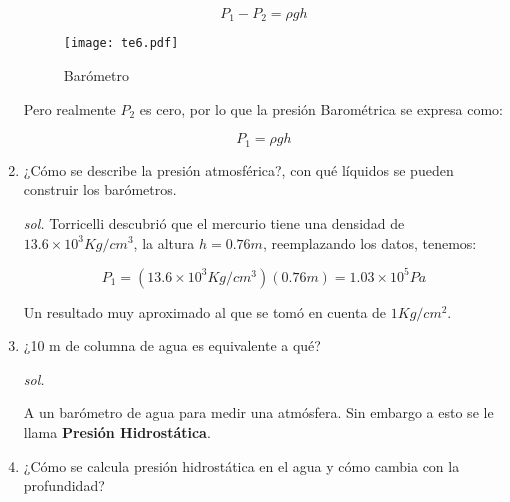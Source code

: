\begin{enumerate}
    \begin{equation*}
        P_1-P_2=\rho gh
    \end{equation*}
    
    \begin{figure}[h!]
      \centering
      \texttt{[image: te6.pdf]}
      \caption{Barómetro}
      \label{te6}
    \end{figure}
    
    Pero realmente $P_2$ es cero, por lo que la presión Barométrica se expresa como:
    
    \begin{equation}
        P_1=\rho gh
    \end{equation}
    
    \item  ¿Cómo se describe la presión atmosférica?, con qué líquidos se pueden construir los barómetros.
    
    \textit{sol. }
    Torricelli descubrió que el mercurio tiene una densidad de $13.6\times 10^3Kg/cm^3$, la altura $h=0.76m$, reemplazando los datos, tenemos:
    
    \begin{equation*}
        P_1=\left( 13.6\times 10^3Kg/cm^3 \right)(0.76m)=1.03\times10^5Pa
    \end{equation*}
    
    Un resultado muy aproximado al que se tomó en cuenta de $1Kg/cm^2$. 
    
    
    \item  ¿10 m de columna de agua es equivalente a qué?
    
    \textit{sol. }
    
    A un barómetro de agua para medir una atmósfera. Sin embargo a esto se le llama \textbf{Presión Hidrostática}.
    
    
    \item  ¿Cómo se calcula presión hidrostática en el agua y cómo cambia con la profundidad?
    

\end{enumerate}
